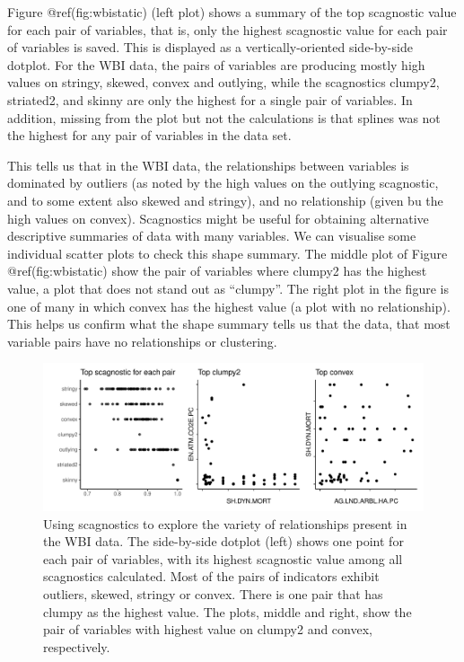 Figure @ref(fig:wbistatic) (left plot) shows a summary of the top
scagnostic value for each pair of variables, that is, only the highest
scagnostic value for each pair of variables is saved. This is displayed
as a vertically-oriented side-by-side dotplot. For the WBI data, the
pairs of variables are producing mostly high values on stringy, skewed,
convex and outlying, while the scagnostics clumpy2, striated2, and
skinny are only the highest for a single pair of variables. In addition,
missing from the plot but not the calculations is that splines was not
the highest for any pair of variables in the data set.

This tells us that in the WBI data, the relationships between variables
is dominated by outliers (as noted by the high values on the outlying
scagnostic, and to some extent also skewed and stringy), and no
relationship (given bu the high values on convex). Scagnostics might be
useful for obtaining alternative descriptive summaries of data with many
variables. We can visualise some individual scatter plots to check this
shape summary. The middle plot of Figure @ref(fig:wbistatic) show the
pair of variables where clumpy2 has the highest value, a plot that does
not stand out as ``clumpy''. The right plot in the figure is one of many
in which convex has the highest value (a plot with no relationship).
This helps us confirm what the shape summary tells us that the data,
that most variable pairs have no relationships or clustering.

\begin{Schunk}
\begin{figure}
\includegraphics[width=1\linewidth]{mason-lee-laa-cook_files/figure-latex/wbistatic-1} \caption[Using scagnostics to explore the variety of relationships present in the WBI data]{Using scagnostics to explore the variety of relationships present in the WBI data. The side-by-side dotplot (left) shows one point for each pair of variables, with its highest scagnostic value among all scagnostics calculated. Most of the pairs of indicators exhibit outliers, skewed, stringy or convex. There is one pair that has clumpy as the highest value. The plots, middle and right, show the pair of variables with highest value on clumpy2 and convex, respectively.}\label{fig:wbistatic}
\end{figure}
\end{Schunk}

